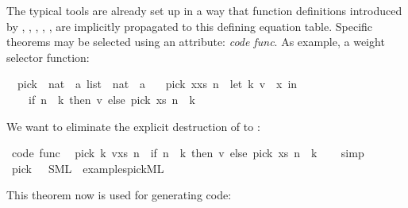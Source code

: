 \begin{isabellebody}
\begin{isamarkuptext}
  The typical  tools are already set up in a way that
  function definitions introduced by \isa{{\isasymDEFINITION}},
  \isa{{\isasymPRIMREC}}, \isa{{\isasymFUN}},
  \isa{{\isasymFUNCTION}}, \isa{{\isasymCONSTDEFS}},
  \isa{{\isasymRECDEF}} are implicitly propagated
  to this defining equation table. Specific theorems may be
  selected using an attribute: \emph{code func}. As example,
  a weight selector function:%
\end{isamarkuptext}%
\isamarkuptrue%
\isamarkupfalse%
\isanewline
\ \ pick\ {\isacharcolon}{\isacharcolon}\ {\isachardoublequoteopen}{\isacharparenleft}nat\ {\isasymtimes}\ {\isacharprime}a{\isacharparenright}\ list\ {\isasymRightarrow}\ nat\ {\isasymRightarrow}\ {\isacharprime}a{\isachardoublequoteclose}\ \isanewline
\ \ {\isachardoublequoteopen}pick\ {\isacharparenleft}x{\isacharhash}xs{\isacharparenright}\ n\ {\isacharequal}\ {\isacharparenleft}let\ {\isacharparenleft}k{\isacharcomma}\ v{\isacharparenright}\ {\isacharequal}\ x\ in\isanewline
\ \ \ \ if\ n\ {\isacharless}\ k\ then\ v\ else\ pick\ xs\ {\isacharparenleft}n\ {\isacharminus}\ k{\isacharparenright}{\isacharparenright}{\isachardoublequoteclose}%
\begin{isamarkuptext}%
\noindent We want to eliminate the explicit destruction
  of  to :%
\end{isamarkuptext}%
\isamarkuptrue%
\isamarkupfalse%
\ {\isacharbrackleft}code\ func{\isacharbrackright}{\isacharcolon}\isanewline
\ \ {\isachardoublequoteopen}pick\ {\isacharparenleft}{\isacharparenleft}k{\isacharcomma}\ v{\isacharparenright}{\isacharhash}xs{\isacharparenright}\ n\ {\isacharequal}\ {\isacharparenleft}if\ n\ {\isacharless}\ k\ then\ v\ else\ pick\ xs\ {\isacharparenleft}n\ {\isacharminus}\ k{\isacharparenright}{\isacharparenright}{\isachardoublequoteclose}\isanewline
%
\isadelimproof
\ \ %
\endisadelimproof
%
\isatagproof
{}\isamarkupfalse%
\ simp%
\endisatagproof
{\isafoldproof}%
%
\isadelimproof
\isanewline
%
\endisadelimproof
\isanewline
{}\isamarkupfalse%
\ pick\ \ \ SML\ \ {\isachardoublequoteopen}examples{\isacharslash}pick{}{\isachardot}ML{\isachardoublequoteclose}%
\begin{isamarkuptext}%
\noindent This theorem now is used for generating code:



\end{isamarkuptext}
\end{isabellebody}
